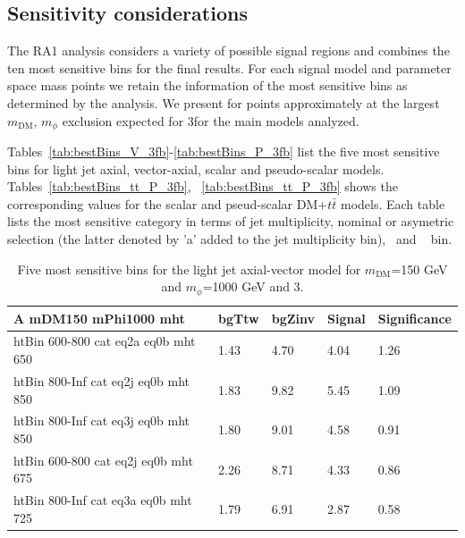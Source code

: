 


\clearpage
\subsection{Sensitivity considerations}

The RA1 analysis considers a variety of possible signal regions and combines the ten most sensitive bins for the final results. For each signal model and parameter space mass points we retain the information of the most sensitive bins as determined by the analysis. We present for points approximately at the largest $m_\textrm{DM}$, $m_\phi$ exclusion expected for 3\fbinv for the main models analyzed.

Tables~\ref{tab:bestBins_V_3fb}-\ref{tab:bestBins_P_3fb} list the five most sensitive bins for light jet axial, vector-axial, scalar and pseudo-scalar models. Tables~\ref{tab:bestBins_tt_P_3fb}, ~\ref{tab:bestBins_tt_P_3fb} shows the corresponding values for the scalar and pseud-scalar DM+$t\bar{t}$ models. Each table lists the most sensitive category in terms of jet multiplicity, nominal or asymetric selection (the latter denoted by 'a' added to the jet multiplicity bin), \HT~and \MHT~ bin.


\begin{table}[h!]
  \centering
  \begin{tabular}{lllll}
    \hline
    \textbf{A mDM150 mPhi1000 mht} & bgTtw & bgZinv & Signal & Significance \\ \hline
    htBin 600-800 cat eq2a eq0b mht 650 & 1.43 & 4.70 & 4.04 &1.26 \\
    htBin 800-Inf cat eq2j eq0b mht 850 & 1.83 & 9.82 & 5.45 &1.09 \\
    htBin 800-Inf cat eq3j eq0b mht 850 & 1.80 & 9.01 & 4.58 &0.91 \\
    htBin 600-800 cat eq2j eq0b mht 675 & 2.26 & 8.71 & 4.33 &0.86 \\
    htBin 800-Inf cat eq3a eq0b mht 725 & 1.79 & 6.91 & 2.87 &0.58 \\
    \hline
  \end{tabular}
  \caption{Five most sensitive bins for the light jet axial-vector model for $m_\textrm{DM}$=150 GeV and $m_\phi$=1000 GeV and 3\fbinv. \label{tab:bestBins_A_3fb}}
\end {table}


